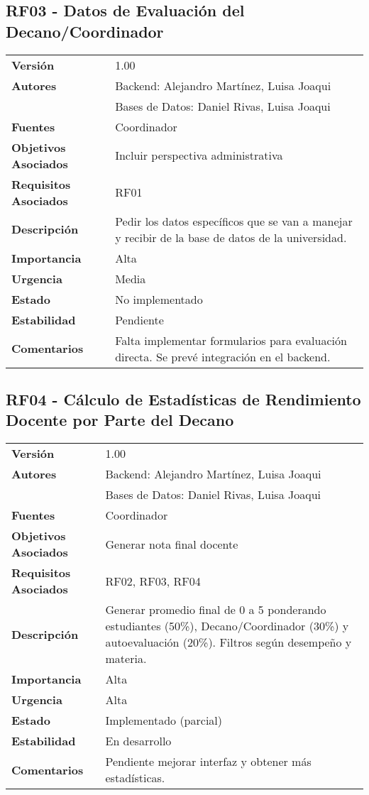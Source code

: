 \documentclass{article}
\begin{document}
\subsection*{RF03 - Datos de Evaluación del Decano/Coordinador}
\begin{longtable}{>{\bfseries}l p{}}
Versión & 1.00 \\
Autores & Backend: Alejandro Martínez, Luisa Joaqui \\ 
        & Bases de Datos: Daniel Rivas, Luisa Joaqui \\
Fuentes & Coordinador \\
Objetivos Asociados & Incluir perspectiva administrativa \\
Requisitos Asociados & RF01 \\
Descripción & Pedir los datos específicos que se van a manejar y recibir de la base de datos de la universidad. \\
Importancia & Alta \\
Urgencia & Media \\
Estado & No implementado \\
Estabilidad & Pendiente \\
Comentarios & Falta implementar formularios para evaluación directa. Se prevé integración en el backend. \\
\end{longtable}

\subsection*{RF04 - Cálculo de Estadísticas de Rendimiento Docente por Parte del Decano}
\begin{longtable}{>{\bfseries}l p{}}
Versión & 1.00 \\
Autores & Backend: Alejandro Martínez, Luisa Joaqui \\ 
        & Bases de Datos: Daniel Rivas, Luisa Joaqui \\
Fuentes & Coordinador \\
Objetivos Asociados & Generar nota final docente \\
Requisitos Asociados & RF02, RF03, RF04 \\
Descripción & Generar promedio final de 0 a 5 ponderando estudiantes (50\%), Decano/Coordinador (30\%) y autoevaluación (20\%). Filtros según desempeño y materia. \\
Importancia & Alta \\
Urgencia & Alta \\
Estado & Implementado (parcial) \\
Estabilidad & En desarrollo \\
Comentarios & Pendiente mejorar interfaz y obtener más estadísticas. \\
\end{longtable}
\end{document}
